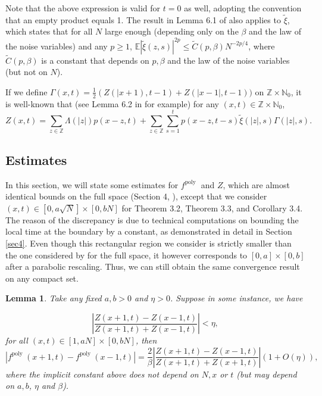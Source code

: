 \documentclass[10pt]{article}
\newtheorem{lemma}[theorem]{Lemma}
\begin{document}
Note that the above expression is valid for $t=0$ as well, adopting the convention that an empty product equals 1. The result in Lemma 6.1 of \cite{adhikari2022invariance} also applies to $\tilde{\xi}$, which states that for all $N$ large enough (depending only on the $\beta$ and the law of the noise variables) and any $p \geq 1$,
$\mathbb{E}|\tilde{\xi}(z, s)|^{2 p} \leq \tilde{C}(p, \beta)N^{-2 p / 4}$,
where $\tilde{C}(p, \beta)$ is a constant that depends on $p, \beta$ and the law of the noise variables (but not on $N$).



If we define $\Gamma(x,t)=\frac{1}{2}(Z(|x+1),t-1)+Z(|x-1|,t-1))$ on $\mathbb{Z} \times \mathbb{N}_0$, it is well-known that (see Lemma 6.2 in \cite{adhikari2022invariance} for example) for any $(x, t) \in \mathbb{Z} \times \mathbb{N}_0$,
\begin{equation} \label{twotermexpansion}
    Z(x, t)=\sum_{z \in \mathbb{Z}}\Lambda(|z|)p(x-z,t)+\sum_{z \in \mathbb{Z}} \sum_{s=1}^{t} p(x-z, t-s) \tilde{\xi}(|z|, s) \Gamma(|z|, s).
\end{equation}

 



\subsection{Estimates}



In this section, we will state some estimates for $f^{\text {poly }}$ and $Z$, which are almost identical bounds on the full space (Section 4, \cite{adhikari2022invariance}), except that we consider $(x,t) \in [0, a\sqrt{N}] \times [0, bN]$ for Theorem 3.2, Theorem 3.3, and Corollary 3.4. The reason of the discrepancy is due to technical computations on bounding the local time at the boundary by a constant, as demonstrated in detail in Section \ref{sec4}. Even though this rectangular region we consider is strictly smaller than the one considered by \cite{adhikari2022invariance} for the full space, it however corresponds to $[0 , a] \times [0,b]$ after a parabolic rescaling. Thus, we can still obtain the same convergence result on any compact set. 

\begin{lemma} \label{lem4.1}
    Take any fixed $a, b>0$ and $\eta>0$. Suppose in some instance, we have

\begin{equation} \label{4.1}
    \left|\frac{Z(x+1, t)-Z(x-1, t)}{Z(x+1, t)+Z(x-1, t)}\right|<\eta,
\end{equation}
for all $(x, t) \in[1, a N] \times[0, b N]$, then
\begin{equation} \label{4.3}
    \left|f^{\text {poly }}(x+1, t)-f^{\text {poly }}(x-1, t)\right|=\frac{2}{\beta}\left|\frac{Z(x+1, t)-Z(x-1, t)}{Z(x+1, t)+Z(x+1, t)}\right|(1+O(\eta)),
\end{equation}
where the implicit constant above does not depend on $N, x$ or $t$ (but may depend on $a, b$, $\eta$ and $\beta$).


\end{lemma}
\end{document}
